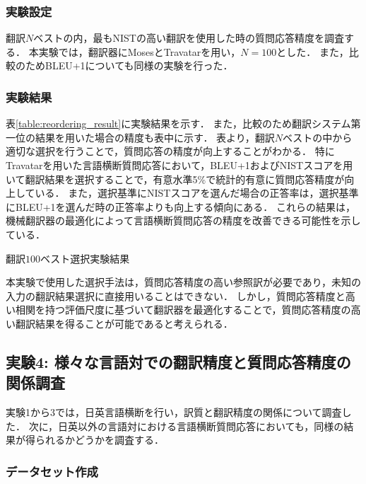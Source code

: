 \documentclass[japanese]{jnlp_1.4}
\begin{document}
\subsubsection{実験設定}

翻訳$N$ベストの内，最もNISTの高い翻訳を使用した時の質問応答精度を調査する．
本実験では，翻訳器にMosesとTravatarを用い，$N=100$とした．
また，比較のためBLEU+1についても同様の実験を行った．


\subsubsection{実験結果}

表\ref{table:reordering_result}に実験結果を示す．
また，比較のため翻訳システム第一位の結果を用いた場合の精度も表中に示す．
表より，翻訳$N$ベストの中から適切な選択を行うことで，質問応答の精度が向上することがわかる．
{特にTravatarを用いた言語横断質問応答において，BLEU+1およびNISTスコアを用いて翻訳結果を選択することで，有意水準5\%で統計的有意に質問応答精度が向上している．}
また，選択基準にNISTスコアを選んだ場合の正答率は，選択基準にBLEU+1を選んだ時の正答率よりも向上する傾向にある．
これらの結果は，{機械翻訳器の最適化によって言語横断質問応答の精度を改善できる可能性を示している．}

\begin{table}[t]
\caption{翻訳$100$ベスト選択実験結果}
\label{table:reordering_result}

\end{table}

{本実験で使用した選択手法は，質問応答精度の高い参照訳が必要であり，未知の入力の翻訳結果選択に直接用いることはできない．
しかし，質問応答精度と高い相関を持つ評価尺度に基づいて翻訳器を最適化することで，質問応答精度の高い翻訳結果を得ることが可能であると考えられる．}


\subsection{{実験4: 様々な言語対での翻訳精度と質問応答精度の関係調査}}
\label{sec:exp4}

{実験1から3では，日英言語横断を行い，訳質と翻訳精度の関係について調査した．
次に，日英以外の言語対における言語横断質問応答においても，同様の結果が得られるかどうかを調査する．}		


\subsubsection{{データセット作成}}
\end{document}
